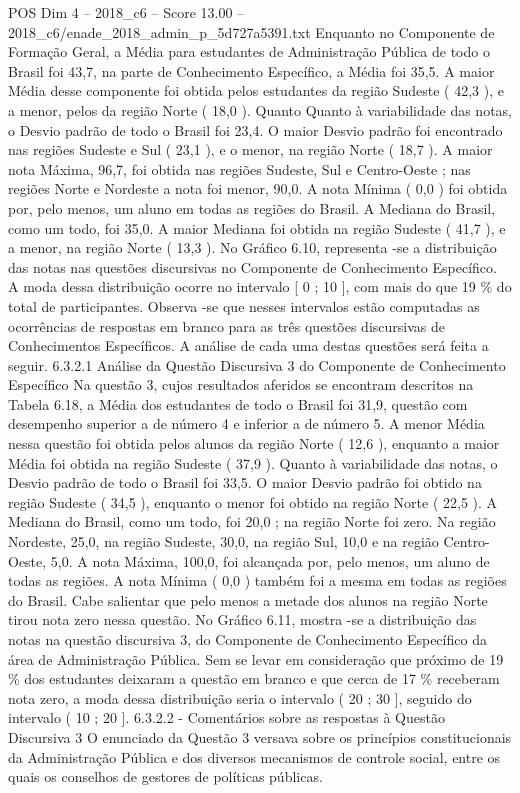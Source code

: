 \begin{textsample}{POS Dim 4 – 2018\_c6 – Score 13.00 – 2018\_c6/enade\_2018\_admin\_p\_5d727a5391.txt}
Enquanto no Componente de Formação Geral, a Média para estudantes de Administração Pública de todo o Brasil foi 43,7, na parte de Conhecimento Específico, a Média foi 35,5.
A maior Média desse componente foi obtida pelos estudantes da região Sudeste ( 42,3 ), e a menor, pelos da região Norte ( 18,0 ).
Quanto Quanto à variabilidade das notas, o Desvio padrão de todo o Brasil foi 23,4.
O maior Desvio padrão foi encontrado nas regiões Sudeste e Sul ( 23,1 ), e o menor, na região Norte ( 18,7 ).
A maior nota Máxima, 96,7, foi obtida nas regiões Sudeste, Sul e Centro-Oeste ; nas regiões Norte e Nordeste a nota foi menor, 90,0.
A nota Mínima ( 0,0 ) foi obtida por, pelo menos, um aluno em todas as regiões do Brasil.
A Mediana do Brasil, como um todo, foi 35,0.
A maior Mediana foi obtida na região Sudeste ( 41,7 ), e a menor, na região Norte ( 13,3 ).
No Gráfico 6.10, representa -se a distribuição das notas nas questões discursivas no Componente de Conhecimento Específico.
A moda dessa distribuição ocorre no intervalo [ 0 ; 10 ], com mais do que 19 \% do total de participantes.
Observa -se que nesses intervalos estão computadas as ocorrências de respostas em branco para as três questões discursivas de Conhecimentos Específicos.
A análise de cada uma destas questões será feita a seguir. 6.3.2.1 Análise da Questão Discursiva 3 do Componente de Conhecimento Específico Na questão 3, cujos resultados aferidos se encontram descritos na Tabela 6.18, a Média dos estudantes de todo o Brasil foi 31,9, questão com desempenho superior a de número 4 e inferior a de número 5.
A menor Média nessa questão foi obtida pelos alunos da região Norte ( 12,6 ), enquanto a maior Média foi obtida na região Sudeste ( 37,9 ).
Quanto à variabilidade das notas, o Desvio padrão de todo o Brasil foi 33,5.
O maior Desvio padrão foi obtido na região Sudeste ( 34,5 ), enquanto o menor foi obtido na região Norte ( 22,5 ).
A Mediana do Brasil, como um todo, foi 20,0 ; na região Norte foi zero.
Na região Nordeste, 25,0, na região Sudeste, 30,0, na região Sul, 10,0 e na região Centro-Oeste, 5,0.
A nota Máxima, 100,0, foi alcançada por, pelo menos, um aluno de todas as regiões.
A nota Mínima ( 0,0 ) também foi a mesma em todas as regiões do Brasil.
Cabe salientar que pelo menos a metade dos alunos na região Norte tirou nota zero nessa questão.
No Gráfico 6.11, mostra -se a distribuição das notas na questão discursiva 3, do Componente de Conhecimento Específico da área de Administração Pública.
Sem se levar em consideração que próximo de 19 \% dos estudantes deixaram a questão em branco e que cerca de 17 \% receberam nota zero, a moda dessa distribuição seria o intervalo ( 20 ; 30 ], seguido do intervalo ( 10 ; 20 ]. 6.3.2.2 - Comentários sobre as respostas à Questão Discursiva 3 O enunciado da Questão 3 versava sobre os princípios constitucionais da Administração Pública e dos diversos mecanismos de controle social, entre os quais os conselhos de gestores de políticas públicas.

\end{textsample}
